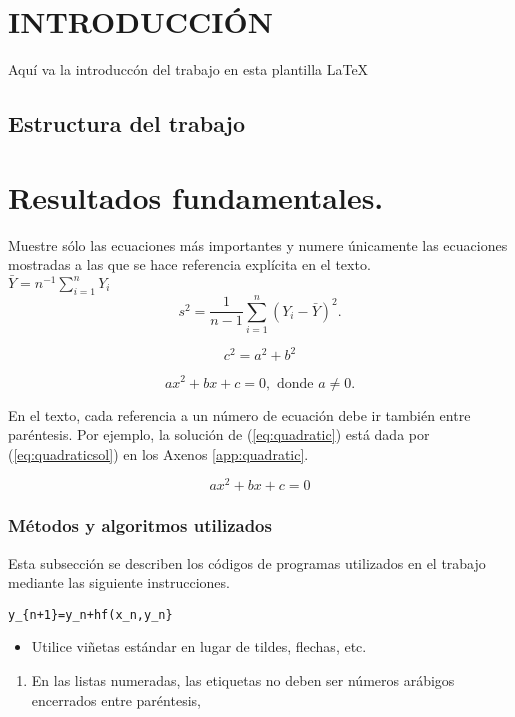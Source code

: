 \section{INTRODUCCI\'ON}
\label{sec:intro}
Aqu\'i va la introducc\'on del trabajo en esta plantilla  \LaTeX\ 
\subsection{Estructura del trabajo}

\section{Resultados fundamentales.}

Muestre s\'olo las ecuaciones m\'as importantes y numere \'unicamente las ecuaciones mostradas a las que se hace referencia expl\'icita en el texto. \\

$\bar Y = n^{-1} \sum_{i=1}^n Y_i$\\
$$s^2 = \frac 1 {n-1} \sum_{i=1}^n (Y_i - \bar Y)^2.$$

\[
 c^2=a^2+b^2
\]

\begin{equation}\label{eq:quadratic}
ax^2 + bx + c = 0, \mbox{ donde } a \ne 0.
\end{equation}

En el texto, cada referencia a un n\'umero de ecuaci\'on debe ir tambi\'en entre par\'entesis. Por ejemplo, la soluci\'on de (\ref{eq:quadratic}) est\'a dada por  (\ref{eq:quadraticsol}) en los Axenos \ref{app:quadratic}.


\begin{equation} \label{eq:quadratic_second}
ax^2 + bx + c = 0
\end{equation}

\subsubsection{M\'etodos y algoritmos utilizados}
Esta  subsecci\'on se describen los c\'odigos de programas utilizados en el trabajo mediante las siguiente instrucciones.

\begin{verbatim}
y_{n+1}=y_n+hf(x_n,y_n}
\end{verbatim}


\begin{itemize}
	\item Utilice vi\~netas est\'andar en lugar de tildes, flechas, etc.
\end{itemize}
\begin{enumerate}
	\item En las listas numeradas, las etiquetas no deben ser n\'umeros ar\'abigos encerrados entre par\'entesis, \cite{simulation}
\end{enumerate}


